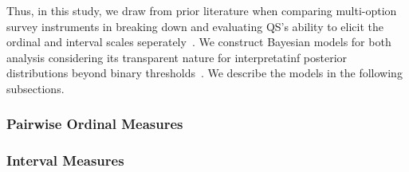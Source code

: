 Thus, in this study, we draw from prior literature when comparing multi-option survey instruments in breaking down and evaluating QS's ability to elicit the ordinal and interval scales seperately~\cite{collewetPreferenceEstimationPoint2023}. We construct Bayesian models for both analysis considering its transparent nature for interpretatinf posterior distributions beyond binary thresholds~\cite{mcelreath2018statistical, kay2016researcher}. We describe the models in the following subsections.

\subsubsection{Pairwise Ordinal Measures}
\label{sec:ordinal_measures}


\subsubsection{Interval Measures}
\label{sec:interval_measures}

